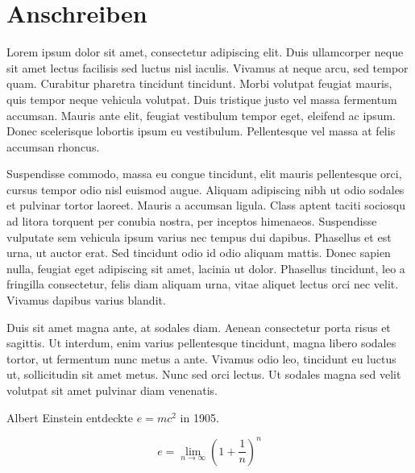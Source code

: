 \section{Anschreiben}\label{sec:anschreiben}
\makelettertitle

Lorem ipsum dolor sit amet, consectetur adipiscing elit.
Duis ullamcorper neque sit amet lectus facilisis sed luctus nisl iaculis.
Vivamus at neque arcu, sed tempor quam.
Curabitur pharetra tincidunt tincidunt.
Morbi volutpat feugiat mauris, quis tempor neque vehicula volutpat.
Duis tristique justo vel massa fermentum accumsan.
Mauris ante elit, feugiat vestibulum tempor eget, eleifend ac ipsum.
Donec scelerisque lobortis ipsum eu vestibulum.
Pellentesque vel massa at felis accumsan rhoncus.

Suspendisse commodo, massa eu congue tincidunt, elit mauris pellentesque orci, cursus tempor odio nisl euismod augue.
Aliquam adipiscing nibh ut odio sodales et pulvinar tortor laoreet.
Mauris a accumsan ligula.
Class aptent taciti sociosqu ad litora torquent per conubia nostra, per inceptos himenaeos.
Suspendisse vulputate sem vehicula ipsum varius nec tempus dui dapibus.
Phasellus et est urna, ut auctor erat.
Sed tincidunt odio id odio aliquam mattis.
Donec sapien nulla, feugiat eget adipiscing sit amet, lacinia ut dolor.
Phasellus tincidunt, leo a fringilla consectetur, felis diam aliquam urna, vitae aliquet lectus orci nec velit.
Vivamus dapibus varius blandit.

Duis sit amet magna ante, at sodales diam.
Aenean consectetur porta risus et sagittis.
Ut interdum, enim varius pellentesque tincidunt, magna libero sodales tortor, ut fermentum nunc metus a ante.
Vivamus odio leo, tincidunt eu luctus ut, sollicitudin sit amet metus.
Nunc sed orci lectus.
Ut sodales magna sed velit volutpat sit amet pulvinar diam venenatis.

Albert Einstein entdeckte $e=mc^2$ in 1905.

\[ e=\lim_{n \to \infty} \left(1+\frac{1}{n}\right)^n \]

\makeletterclosing

